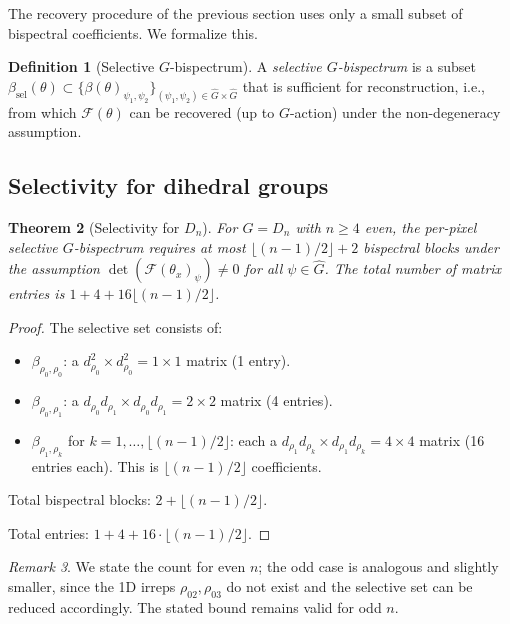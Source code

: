 \documentclass{article}
\newtheorem{theorem}{Theorem}[section]
\theoremstyle{definition}
\newtheorem{definition}[theorem]{Definition}
\theoremstyle{remark}
\newtheorem{remark}[theorem]{Remark}
\newcommand{\FF}{\mathcal{F}}
\newcommand{\Ghat}{\widehat{G}}
\begin{document}
The recovery procedure of the previous section uses only a small subset of bispectral coefficients. We formalize this.

\begin{definition}[Selective $G$-bispectrum]\label{def:selective}
A \textit{selective $G$-bispectrum} is a subset $\beta_{\mathrm{sel}}(\theta) \subset \{\beta(\theta)_{\psi_1,\psi_2}\}_{(\psi_1,\psi_2) \in \Ghat \times \Ghat}$ that is sufficient for reconstruction, i.e., from which $\FF(\theta)$ can be recovered (up to $G$-action) under the non-degeneracy assumption.
\end{definition}

\subsection{Selectivity for dihedral groups}

\begin{theorem}[Selectivity for $D_n$]\label{thm:selectivity}
For $G = D_n$ with $n \geq 4$ even, the per-pixel selective $G$-bispectrum requires at most $\lfloor(n-1)/2\rfloor + 2$ bispectral blocks under the assumption $\det(\FF(\theta_x)_\psi) \neq 0$ for all $\psi \in \Ghat$. The total number of matrix entries is $1 + 4 + 16\lfloor(n-1)/2\rfloor$.
\end{theorem}
\begin{proof}
The selective set consists of:
\begin{itemize}
    \item $\beta_{\rho_0,\rho_0}$: a $d_{\rho_0}^2 \times d_{\rho_0}^2 = 1 \times 1$ matrix (1 entry).
    \item $\beta_{\rho_0,\rho_1}$: a $d_{\rho_0}d_{\rho_1} \times d_{\rho_0}d_{\rho_1} = 2 \times 2$ matrix (4 entries).
    \item $\beta_{\rho_1,\rho_k}$ for $k = 1, \ldots, \lfloor(n-1)/2\rfloor$: each a $d_{\rho_1}d_{\rho_k} \times d_{\rho_1}d_{\rho_k} = 4 \times 4$ matrix (16 entries each). This is $\lfloor(n-1)/2\rfloor$ coefficients.
\end{itemize}
Total bispectral blocks: $2 + \lfloor(n-1)/2\rfloor$.

Total entries: $1 + 4 + 16 \cdot \lfloor(n-1)/2\rfloor$.
\end{proof}

\begin{remark}
We state the count for even $n$; the odd case is analogous and slightly smaller, since the 1D irreps $\rho_{02}, \rho_{03}$ do not exist and the selective set can be reduced accordingly. The stated bound remains valid for odd $n$.
\end{remark}
\end{document}
